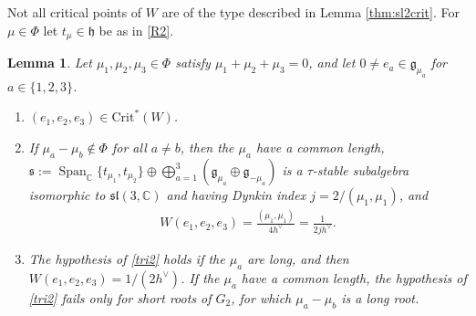 \documentclass[leqno,10pt]{amsart}
\newtheorem{lemma}[theorem]{Lemma}%
\theoremstyle{definition}
\numberwithin{equation}{section}
\newcommand{\h}{\mathfrak{h}}
\newcommand{\spn}{\operatorname{Span}}
\newcommand{\sll}{\mathfrak{sl}}
\newcommand{\g}{\mathfrak{g}}
\newcommand{\com}{\mathbb C}
\newcommand{\crtnt}{\mathrm{Crit}^*}
\newcommand{\hv}{h^\vee}
\newcommand{\subs}{\mathfrak{s}}
\begin{document}
Not all critical points of $W$ are of the type described in Lemma \ref{thm:sl2crit}. For $\mu \in \Phi$ let $t_{\mu} \in \h$ be as in \ref{R2}.
\begin{lemma}\label{thm:roottriangle}
Let $\mu_{1}, \mu_{2}, \mu_{3} \in \Phi$ satisfy $\mu_{1} + \mu_{2} + \mu_{3} = 0$, and let $0 \neq e_{a} \in \g_{\mu_{a}}$ for $a \in \{1, 2, 3\}$.
\begin{enumerate}[label=(\arabic*), ref=(\arabic*)]
\item\label{tri1} $(e_{1}, e_{2}, e_{3}) \in \crtnt(W)$.
\item\label{tri2} If $\mu_{a} - \mu_{b} \notin \Phi$ for all $a \neq b$, then the $\mu_{a}$ have a common length, $\subs := \spn_{\com}\{t_{\mu_{1}}, t_{\mu_{2}}\} \oplus \bigoplus_{a=1}^{3}(\g_{\mu_{a}} \oplus \g_{-\mu_{a}})$ is a $\tau$-stable subalgebra isomorphic to $\sll(3, \com)$ and having Dynkin index $j = 2/(\mu_{1}, \mu_{1})$, and
\begin{align}\label{eq:trianglevalue}
W(e_{1}, e_{2}, e_{3}) = \frac{(\mu_{1}, \mu_{1})}{4\hv} = \frac{1}{2j\hv}.
\end{align}
\item\label{tri3} The hypothesis of \ref{tri2} holds if the $\mu_{a}$ are long, and then $W(e_{1}, e_{2}, e_{3}) = 1/(2\hv)$. If the $\mu_{a}$ have a common length, the hypothesis of \ref{tri2} fails only for short roots of $G_{2}$, for which $\mu_{a} - \mu_{b}$ is a long root.
\end{enumerate}
\end{lemma}
\end{document}
